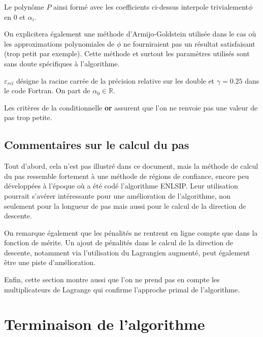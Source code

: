 \documentclass[a4paper,11pt]{article}
\newcommand{\real}{\mathbb{R}}
\numberwithin{equation}{section}
\begin{document}
Le polynôme $P$ ainsi formé avec les coefficients ci-dessus interpole trivialement$\phi$ en $0$ et $\alpha_i$.


On explicitera également une méthode d'Armijo-Goldstein utilisée dans le cas où les approximations polynomiales de $\phi$ ne fourniraient pas un résultat satisfaisant (trop petit par exemple). Cette méthode et surtout les paramètres utilisés sont sans doute spécifiques à l'algorithme. 

$\varepsilon_{rel}$ désigne la racine carrée de la précision relative sur les double et $\gamma = 0.25$ dans le code Fortran.
On part de $\alpha_{0} \in \real$.
\begin{algorithmic}
\ENDWHILE
\RETURN{$\alpha$}
\end{algorithmic}

Les critères de la conditionnelle \textbf{or} assurent que l'on ne renvoie pas une valeur de pas trop petite.

\subsection{Commentaires sur le calcul du pas}

Tout d'abord, cela n'est pas illustré dans ce document, mais la méthode de calcul du pas ressemble fortement à une méthode de régions de confiance, encore peu développées à l'époque où a été codé l'algorithme ENLSIP. Leur utilisation pourrait s'avérer intéressante pour une amélioration de l'algorithme, non seulement pour la longueur de pas mais aussi pour le calcul de la direction de descente.  

On remarque également que les pénalités ne rentrent en ligne compte que dans la fonction de mérite. Un ajout de pénalités dans le calcul de la direction de descente, notamment via l'utilisation du Lagrangien augmenté, peut également être une piste d'amélioration.

Enfin, cette section montre aussi que l'on ne prend pas en compte les multiplicateurs de Lagrange qui confirme l'approche primal de l'algorithme.

\section{Terminaison de l'algorithme}
\end{document}
